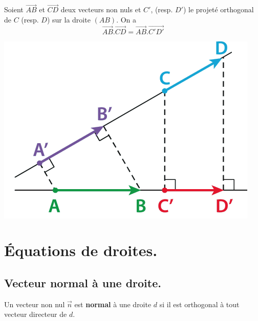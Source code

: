 \documentclass[a4paper,11pt]{article}
\theoremstyle{break}
\begin{document}
\begin{proposition}
 Soient $\vec{AB}$ et $\vec{CD}$ deux vecteurs non nuls et $C'$, (resp. $D'$)
 le projeté orthogonal de $C$ (resp. $D$) sur la droite $(AB)$. On a 
 $$\vec{AB}.\vec{CD}=\vec{AB}.\vec{C'D'}$$
 
   \begin{center}
    \includegraphics[scale=0.5]{../Images/projetes.png}
  \end{center}
 
 
\end{proposition}
  
 \newpage

 \section{\'Equations de droites.}
 
 \subsection{Vecteur normal à une droite.}
 
 \begin{definition}
  Un vecteur non nul $\vec{n}$ est \textbf{normal} à une droite $d$ si il est orthogonal à tout vecteur
  directeur de $d$.
  
 \end{definition}
 
\end{document}
